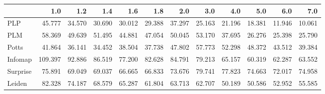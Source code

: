 \begin{tabular}{lrrrrrrrrrrr}
\toprule
{} &     1.0 &    1.2 &    1.4 &    1.6 &    1.8 &    2.0 &    3.0 &    4.0 &    5.0 &    6.0 &    7.0 \\
\midrule
PLP      &  45.777 & 34.570 & 30.690 & 30.012 & 29.388 & 37.297 & 25.163 & 21.196 & 18.381 & 11.946 & 10.061 \\
PLM      &  58.369 & 49.639 & 51.495 & 44.881 & 47.054 & 50.045 & 53.170 & 37.695 & 26.276 & 25.398 & 25.790 \\
Potts    &  41.864 & 36.141 & 34.452 & 38.504 & 37.738 & 47.802 & 57.773 & 52.298 & 48.372 & 43.512 & 39.384 \\
Infomap  & 109.397 & 92.886 & 86.519 & 77.200 & 82.628 & 84.791 & 79.213 & 65.157 & 60.319 & 62.287 & 63.552 \\
Surprise &  75.891 & 69.049 & 69.037 & 66.665 & 66.833 & 73.676 & 79.741 & 77.823 & 74.663 & 72.017 & 74.958 \\
Leiden   &  82.328 & 74.187 & 68.579 & 65.287 & 61.804 & 63.713 & 62.707 & 50.189 & 50.586 & 52.952 & 55.585 \\
\bottomrule
\end{tabular}
